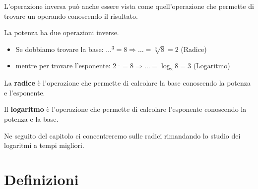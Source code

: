 L'operazione inversa può anche essere vista come quell'operazione che 
permette di trovare un operando conoscendo il risultato.

% 
% 
% 
% 
% 
% 
% 
% 
% 

La potenza ha due operazioni inverse. 
\begin{itemize}
\item 
Se dobbiamo trovare la base: \quad 
\(\dots ^3 = 8 \Rightarrow \dots = \sqrt[3]{8} = 2\) (Radice)
\item 
mentre per trovare l'esponente: \quad 
\(2 ^{\dots} = 8 \Rightarrow \dots = \log_{2}{8} = 3\) (Logaritmo)
\end{itemize}

\begin{definizione}{}{}
La \textbf{radice} è l'operazione che permette di calcolare la base
conoscendo la potenza e l'esponente.
\end{definizione}

\begin{definizione}{}{}
Il \textbf{logaritmo} è l'operazione che permette di calcolare
l'esponente conoscendo la potenza e la base.
\end{definizione}

Ne seguito del capitolo ci concentreremo sulle radici rimandando lo studio
dei logaritmi a tempi migliori. 

\section{Definizioni}
\label{sec:radicali_definizioni}

